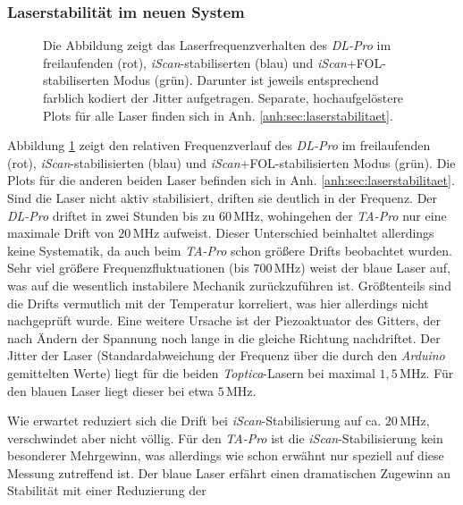 \subsubsection{Laserstabilität im neuen
System}\label{subsubsec:stabilitaetsmessungen_software_neues_system}
\begin{figure}[h]
 	\centering
 	\footnotesize
	
	\caption[Laserfrequenzverhalten \textit{DL-Pro}]{Die Abbildung zeigt das
	Laserfrequenzverhalten des \textit{DL-Pro} im freilaufenden (rot),
	\textit{iScan}-stabiliserten (blau) und \textit{iScan}+FOL-stabiliserten Modus
	(grün).
	Darunter ist jeweils entsprechend farblich kodiert der Jitter aufgetragen.
	Separate, hochaufgelöstere Plots für alle Laser finden sich in Anh.
	\ref{anh:sec:laserstabilitaet}.}
	\label{fig:laserstabilitaet_b_alles}
\end{figure}
Abbildung \ref{fig:laserstabilitaet_b_alles} zeigt den relativen
Frequenzverlauf des \textit{DL-Pro} im freilaufenden (rot),
\textit{iScan}-stabilisierten (blau) und \textit{iScan}+FOL-stabilisierten Modus
(grün). Die Plots für die anderen beiden Laser befinden sich in Anh.
\ref{anh:sec:laserstabilitaet}. Sind die Laser nicht aktiv stabilisiert, driften
sie deutlich in der Frequenz. Der \textit{DL-Pro} driftet in zwei Stunden bis zu $60\,$MHz, wohingehen der
\textit{TA-Pro} nur eine maximale Drift von $20\,$MHz aufweist. Dieser
Unterschied beinhaltet allerdings keine Systematik, da auch beim \textit{TA-Pro}
schon größere Drifts beobachtet wurden. Sehr viel größere Frequenzfluktuationen (bis $700\,$MHz)
weist der blaue Laser auf, was auf die wesentlich instabilere Mechanik
zurückzuführen ist. Größtenteils sind die Drifts vermutlich mit der Temperatur
korreliert, was hier allerdings nicht nachgeprüft wurde. Eine weitere Ursache
ist der Piezoaktuator des Gitters, der nach Ändern der Spannung noch lange in
die gleiche Richtung nachdriftet. Der Jitter der Laser (Standardabweichung der
Frequenz über die durch den \textit{Arduino} gemittelten Werte) liegt für die
beiden \textit{Toptica}-Lasern bei maximal $1,5\,$MHz. Für den blauen Laser
liegt dieser bei etwa $5\,$MHz.\par
Wie erwartet reduziert sich die Drift bei \textit{iScan}-Stabilisierung auf ca. $20\,$MHz,
verschwindet aber nicht völlig. Für den \textit{TA-Pro} ist die
\textit{iScan}-Stabilisierung kein besonderer Mehrgewinn, was allerdings wie
schon erwähnt nur speziell auf diese Messung zutreffend ist. Der blaue Laser
erfährt einen dramatischen Zugewinn an Stabilität mit einer Reduzierung der
